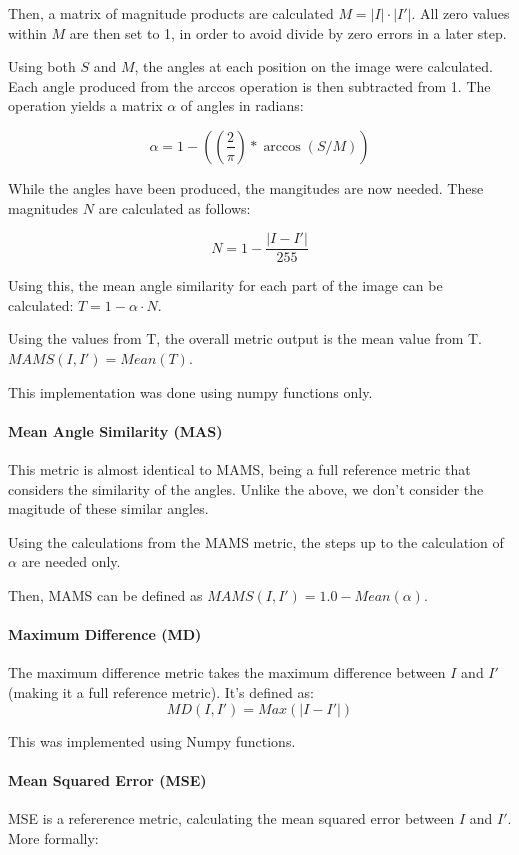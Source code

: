 \documentclass[11pt,a4paper]{article}
\begin{document}
                Then, a matrix of magnitude products are calculated $M = |I| \cdot |I'|$. All zero values within $M$ are then set to 1, in order to avoid divide by zero errors in a later step.

                Using both $S$ and $M$, the angles at each position on the image were calculated. Each angle produced from the arccos operation is then subtracted from 1. The operation yields a matrix $\alpha$ of angles in radians:

                $$\alpha = 1 - ((\frac{2}{\pi}) * \arccos(S / M))$$
            
                While the angles have been produced, the mangitudes are now needed. These magnitudes $N$ are calculated as follows:

                $$N = 1 - \frac{|I - I'|}{255}$$

                Using this, the mean angle similarity for each part of the image can be calculated:
                $T = 1 - \alpha \cdot N$.

                Using the values from T, the overall metric output is the mean value from T. $MAMS(I, I') = Mean(T)$.
                
                This implementation was done using numpy functions only.
            \paragraph{Mean Angle Similarity (MAS)}
                This metric is almost identical to MAMS, being a full reference metric that considers the similarity of the angles. Unlike the above, we don't
                consider the magitude of these similar angles.

                Using the calculations from the MAMS metric, the steps up to the calculation of $\alpha$ are needed only.

                Then, MAMS can be defined as $MAMS(I, I') = 1.0 - Mean(\alpha)$.

            \paragraph{Maximum Difference (MD)}
                The maximum difference metric takes the maximum difference between $I$ and $I'$ (making it a full reference metric). It's defined as:
                $$MD(I, I') = Max(|I - I'|)$$

                This was implemented using Numpy functions.
            \paragraph{Mean Squared Error (MSE)}
                MSE is a refererence metric, calculating the mean squared error between $I$ and $I'$. More formally:
\end{document}
